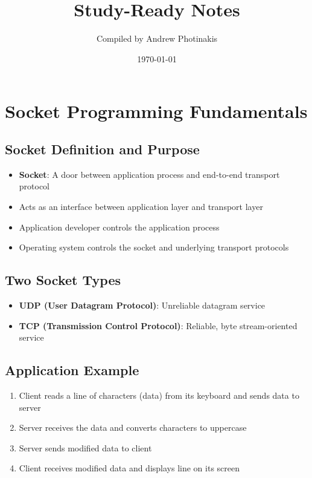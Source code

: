 \documentclass[12pt]{article}
\title{\TOPICTITLE\\\large Study-Ready Notes}
\author{Compiled by Andrew Photinakis}
\date{\today}
\begin{document}
\maketitle
\tableofcontents
\newpage


\section{Socket Programming Fundamentals}

\subsection{Socket Definition and Purpose}

\begin{itemize}
    \item \textbf{Socket}: A door between application process and end-to-end transport protocol
    \item Acts as an interface between application layer and transport layer
    \item Application developer controls the application process
    \item Operating system controls the socket and underlying transport protocols
\end{itemize}

\subsection{Two Socket Types}

\begin{itemize}
    \item \textbf{UDP (User Datagram Protocol)}: Unreliable datagram service
    \item \textbf{TCP (Transmission Control Protocol)}: Reliable, byte stream-oriented service
\end{itemize}

\subsection{Application Example}

\begin{enumerate}
    \item Client reads a line of characters (data) from its keyboard and sends data to server
    \item Server receives the data and converts characters to uppercase
    \item Server sends modified data to client
    \item Client receives modified data and displays line on its screen
\end{enumerate}
\end{document}
